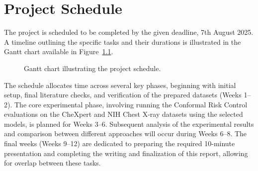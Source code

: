 \chapter{Project Schedule}
\label{ch:schedule}

The project is scheduled to be completed by the given deadline, 7th August 2025.
A timeline outlining the specific tasks and their durations
is illustrated in the Gantt chart available in Figure~\ref{fig:gantt_chart}.

\begin{figure}[h]
    \centering
    
    \caption{Gantt chart illustrating the project schedule.}
    \label{fig:gantt_chart}
\end{figure}

The schedule allocates time across several key phases, beginning with initial setup,
final literature checks, and verification of the prepared datasets (Weeks 1--2).
The core experimental phase, involving running the Conformal Risk Control evaluations
on the CheXpert and NIH Chest X-ray datasets using the selected models, is planned for Weeks 3--6.
Subsequent analysis of the experimental results and comparison
between different approaches will occur during Weeks 6--8.
The final weeks (Weeks 9--12) are dedicated to preparing the required 10-minute presentation
and completing the writing and finalization of this report,
allowing for overlap between these tasks.
